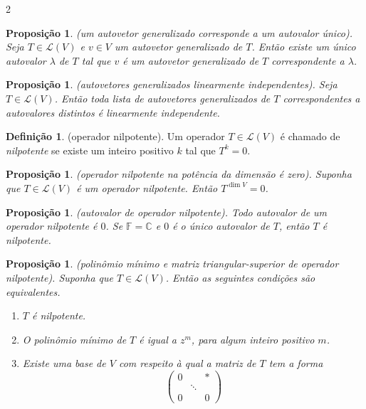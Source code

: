 \documentclass{article}
\theoremstyle{plain}
\newtheorem{prop}[thm]{Proposição}
\theoremstyle{definition}
\newtheorem{defn}{Definição}[section]
\theoremstyle{remark}
\begin{document}
\begin{multicols}{2}
\begin{prop} (um autovetor generalizado corresponde a um autovalor único).
    Seja \(T \in \mathcal{L}(V)\) e \(v \in V\) um autovetor generalizado de \(T\). Então existe um único autovalor \(\lambda\) de \(T\) tal que \(v\) é um autovetor generalizado de \(T\) correspondente a \(\lambda\).
\end{prop}

\begin{prop} (autovetores generalizados linearmente independentes).
    Seja \(T \in \mathcal{L}(V)\). Então toda lista de autovetores generalizados de \(T\) correspondentes a autovalores distintos é linearmente independente.
\end{prop}

\begin{defn} (operador nilpotente).
    Um operador \(T \in \mathcal{L}(V)\) é chamado de \emph{nilpotente} se existe um inteiro positivo \(k\) tal que \(T^k = 0\).
\end{defn}

\begin{prop} (operador nilpotente na potência da dimensão é zero).
    Suponha que \(T \in \mathcal{L}(V)\) é um operador nilpotente. Então \(T^{\dim V} = 0\).
\end{prop}

\begin{prop} (autovalor de operador nilpotente).
    Todo autovalor de um operador nilpotente é \(0\). Se \(\mathbb{F} = \mathbb{C}\) e \(0\) é o único autovalor de \(T\), então \(T\) é nilpotente.
\end{prop}

\begin{prop} (polinômio mínimo e matriz triangular-superior de operador nilpotente).
    Suponha que \(T \in \mathcal{L}(V)\). Então as seguintes condições são equivalentes.
    \begin{enumerate}
        \item [\textup{(a)}] \(T\) é nilpotente.
        \item [\textup{(b)}] O polinômio mínimo de \(T\) é igual a \(z^m\), para algum inteiro positivo \(m\).
        \item [\textup{(c)}] Existe uma base de \(V\) com respeito à qual a matriz de \(T\) tem a forma 
        \[
            \begin{pmatrix*}
                0 & & * \\
                & \ddots & \\
                0 & & 0
            \end{pmatrix*}
        \]
    \end{enumerate}
\end{prop}


\end{multicols}
\end{document}
